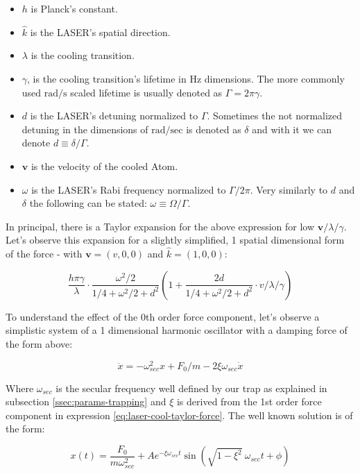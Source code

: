 \begin{itemize}
	\item $h$ is Planck's constant.
	\item $\hat{k}$ is the LASER's spatial direction.
	\item $\lambda$ is the cooling transition.
	\item $\gamma$, is the cooling transition's lifetime in Hz dimensions. The more commonly used $\mathrm{rad}/\mathrm{s}$ scaled lifetime is usually denoted as $\Gamma = 2\pi \gamma$.
	\item $d$ is the LASER's detuning normalized to $\Gamma$. Sometimes the not normalized detuning in the dimensions of $\mathrm{rad}/\mathrm{sec}$ is denoted as $\delta$ and with it we can denote $d \equiv \delta/\Gamma$.
	\item $\mathbf{v}$ is the velocity of the cooled Atom.
	\item $\omega$ is the LASER's Rabi frequency normalized to $\Gamma/2\pi$. Very similarly to $d$ and $\delta$ the following can be stated: $\omega \equiv \Omega/\Gamma$.
\end{itemize}

In principal, there is a Taylor expansion for the above expression for low $\mathbf{v}/\lambda/\gamma$. Let's observe this expansion for a slightly simplified, 1 spatial dimensional form of the force - with $\mathbf{v} = (v,0,0)$ and $\hat{k} = (1,0,0)$:

\begin{equation}
	\frac{h \pi \gamma}{\lambda} \cdot \frac{\omega^2/2}{1/4 + \omega^2/2 + d^2} \left(
		1 + \frac{2d}{1/4 + \omega^2/2 + d^2} \cdot v/\lambda/\gamma
	\right)
	\label{eq:laser-cool-taylor-force}
\end{equation}

To understand the effect of the 0th order force component, let's observe a simplistic system of a 1 dimensional harmonic oscillator with a damping force of the form above:

\begin{equation}
	\ddot{x} = - \omega_{sec}^2 x + F_0/m - 2 \xi \omega_{sec} \dot{x}
\end{equation}

Where $\omega_{sec}$ is the secular frequency well defined by our trap as explained in subsection \ref{ssec:params-trapping} and $\xi$ is derived from the 1st order force component in expression \ref{eq:laser-cool-taylor-force}. The well known solution is of the form: 

\begin{equation}
	x(t) = \frac{F_0}{m \omega_{sec}^2} + A e^{-\xi \omega_{sec} t} \sin(\sqrt{1-\xi^2}\ \omega_{sec} t + \phi)
\end{equation}

